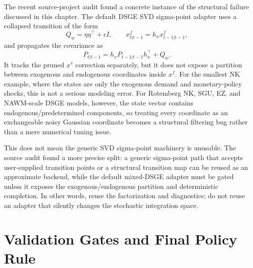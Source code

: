 The recent source-project audit found a concrete instance of the structural
failure discussed in this chapter.  The default DSGE SVD sigma-point adapter
uses a collapsed transition of the form
\[
  Q_w = \eta\eta^\top + \epsilon I,\qquad
  x_{t|t-1}^f = h_x x_{t-1|t-1}^f,
\]
and propagates the covariance as
\[
  P_{t|t-1} = h_x P_{t-1|t-1} h_x^\top + Q_w.
\]
It tracks the pruned $x^s$ correction separately, but it does not expose a
partition between exogenous and endogenous coordinates inside $x^f$.  For the
smallest NK example, where the states are only the exogenous demand and
monetary-policy shocks, this is not a serious modeling error.  For Rotemberg NK,
SGU, EZ, and NAWM-scale DSGE models, however, the state vector contains
endogenous/predetermined components, so treating every coordinate as an
exchangeable noisy Gaussian coordinate becomes a structural filtering bug rather
than a mere numerical tuning issue.

This does not mean the generic SVD sigma-point machinery is unusable.  The
source audit found a more precise split: a generic sigma-point path that accepts
user-supplied transition points or a structural transition map can be reused as
an approximate backend, while the default mixed-DSGE adapter must be gated
unless it exposes the exogenous/endogenous partition and deterministic
completion.  In other words, reuse the factorization and diagnostics; do not
reuse an adapter that silently changes the stochastic integration space.



\section{Validation Gates and Final Policy Rule}
\label{sec:bf-structural-deterministic-required-tests}

